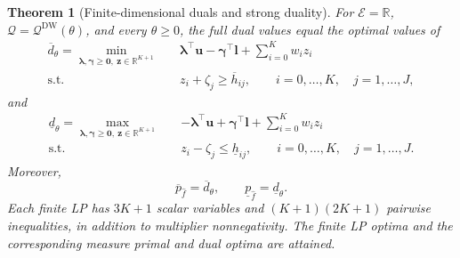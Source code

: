 \documentclass[review,11pt,3p,authoryear,nopreprintline]{elsarticle}
\newtheorem{theorem}{Theorem}
\begin{document}
\begin{theorem}[Finite-dimensional duals and strong duality]
  \label{thm-finite-dual-reformulations}
  For $\mathcal E=\mathbb R$, $\mathcal Q=\mathcal Q^{\mathrm{DW}}(\theta)$, and every $\theta\ge0$, the full dual values equal the optimal values of
  \begin{equation}
    \begin{aligned}
      \overline d_\theta
      =\min_{\bm\lambda,\bm\gamma\ge\bm 0,\ \bm z\in\mathbb R^{K+1}}\quad&
        \bm\lambda^\top\bm u-\bm\gamma^\top\bm l+\sum_{i=0}^K w_i z_i\\
      \text{s.t.}\quad&
        z_i+\zeta_j\ge\overline h_{ij},
        \qquad i=0,\ldots,K,\quad j=1,\ldots,J,
    \end{aligned}
    \label{eq-finite-upper-dual}
  \end{equation}
  and
  \begin{equation}
    \begin{aligned}
      \underline d_\theta
      =\max_{\bm\lambda,\bm\gamma\ge\bm 0,\ \bm z\in\mathbb R^{K+1}}\quad&
        -\bm\lambda^\top\bm u+\bm\gamma^\top\bm l+\sum_{i=0}^K w_i z_i\\
      \text{s.t.}\quad&
        z_i-\zeta_j\le\underline h_{ij},
        \qquad i=0,\ldots,K,\quad j=1,\ldots,J.
    \end{aligned}
    \label{eq-finite-lower-dual}
  \end{equation}
  Moreover,
  \begin{equation}
    \overline p_{\hat f}=\overline d_\theta,\qquad
    \underline p_{\hat f}=\underline d_\theta.
    \label{eq-strong-duality}
  \end{equation}
  Each finite LP has $3K+1$ scalar variables and $(K+1)(2K+1)$ pairwise inequalities, in addition to multiplier nonnegativity. The finite LP optima and the corresponding measure primal and dual optima are attained.
\end{theorem}
\end{document}
